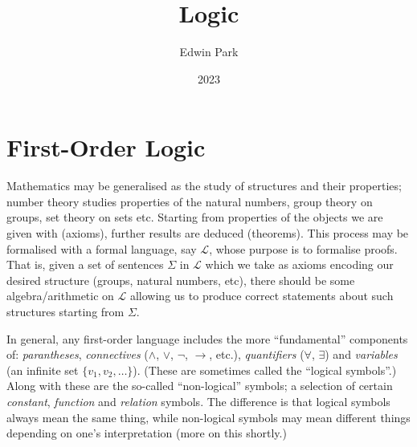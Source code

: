 \documentclass{article}
\title{Logic}
\author{Edwin Park}
\date{2023}
\theoremstyle{definition}
\begin{document}
\clearpage\maketitle\thispagestyle{empty}
\newpage
\tableofcontents
\newpage\setcounter{page}{1}
\section{First-Order Logic}
Mathematics may be generalised as the study of structures and their properties; number theory studies properties of the natural numbers, group theory on groups, set theory on sets etc. Starting from properties of the objects we are given with (axioms), further results are deduced (theorems). This process may be formalised with a formal language, say $\mathcal{L}$, whose purpose is to formalise proofs. That is, given a set of sentences $\Sigma$ in $\mathcal{L}$ which we take as axioms encoding our desired structure (groups, natural numbers, etc), there should be some algebra/arithmetic on $\mathcal{L}$ allowing us to produce correct statements about such structures starting from $\Sigma$.\par

In general, any first-order language includes the more ``fundamental'' components of: \emph{parantheses}, \emph{connectives} ($\land$, $\lor$, $\neg$, $\rightarrow$, etc.), \emph{quantifiers} ($\forall$, $\exists$) and \emph{variables} (an infinite set $\{v_1,v_2,\dots\}$). (These are sometimes called the ``logical symbols''.) Along with these are the so-called ``non-logical'' symbols; a selection of certain \emph{constant}, \emph{function} and \emph{relation} symbols. The difference is that logical symbols always mean the same thing, while non-logical symbols may mean different things depending on one's interpretation (more on this shortly.)\par
\end{document}
